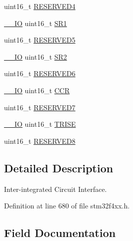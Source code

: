 \begin{DoxyCompactItemize}
\item 
uint16\+\_\+t \hyperlink{struct_i2_c___type_def_aa0223808025f5bf9c056185038c9d545}{R\+E\+S\+E\+R\+V\+E\+D4}
\item 
\hyperlink{group___c_m_s_i_s__core__definitions_gaec43007d9998a0a0e01faede4133d6be}{\+\_\+\+\_\+\+IO} uint16\+\_\+t \hyperlink{struct_i2_c___type_def_a1e79a16729e8d1032d9fe552d50dce41}{S\+R1}
\item 
uint16\+\_\+t \hyperlink{struct_i2_c___type_def_abd36010ac282682d1f3c641b183b1b6f}{R\+E\+S\+E\+R\+V\+E\+D5}
\item 
\hyperlink{group___c_m_s_i_s__core__definitions_gaec43007d9998a0a0e01faede4133d6be}{\+\_\+\+\_\+\+IO} uint16\+\_\+t \hyperlink{struct_i2_c___type_def_a682809d3f8187cdefb9d615e89b67e65}{S\+R2}
\item 
uint16\+\_\+t \hyperlink{struct_i2_c___type_def_aab502dde158ab7da8e7823d1f8a06edb}{R\+E\+S\+E\+R\+V\+E\+D6}
\item 
\hyperlink{group___c_m_s_i_s__core__definitions_gaec43007d9998a0a0e01faede4133d6be}{\+\_\+\+\_\+\+IO} uint16\+\_\+t \hyperlink{struct_i2_c___type_def_a7ac198788f460fa6379bceecab79c5f7}{C\+CR}
\item 
uint16\+\_\+t \hyperlink{struct_i2_c___type_def_ab1820c97e368d349f5f4121f015d9fab}{R\+E\+S\+E\+R\+V\+E\+D7}
\item 
\hyperlink{group___c_m_s_i_s__core__definitions_gaec43007d9998a0a0e01faede4133d6be}{\+\_\+\+\_\+\+IO} uint16\+\_\+t \hyperlink{struct_i2_c___type_def_a7fbb70132ee565bb179078b6ee20cc2b}{T\+R\+I\+SE}
\item 
uint16\+\_\+t \hyperlink{struct_i2_c___type_def_afc22764fbf9ee7ce28174d65d0260f18}{R\+E\+S\+E\+R\+V\+E\+D8}
\end{DoxyCompactItemize}


\subsection{Detailed Description}
Inter-\/integrated Circuit Interface. 

Definition at line 680 of file stm32f4xx.\+h.



\subsection{Field Documentation}
\mbox{\label{struct_i2_c___type_def_a7ac198788f460fa6379bceecab79c5f7}} 
